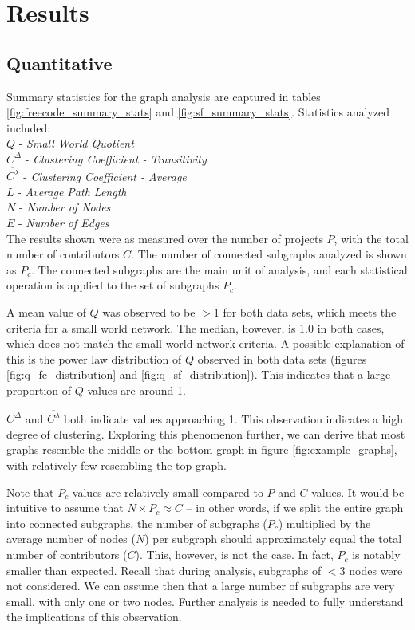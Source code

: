 \documentclass{proc}
\begin{document}
\section{Results}

\subsection{Quantitative}




Summary statistics for the graph analysis are captured in tables \ref{fig:freecode_summary_stats} and \ref{fig:sf_summary_stats}.  Statistics analyzed included:\\
$Q$ - \textit{Small World Quotient}\\
$C^\Delta$ - \textit{Clustering Coefficient - Transitivity}\\
$\overline{C^\lambda}$ - \textit{Clustering Coefficient - Average}\\
$L$ - \textit{Average Path Length}\\
$N$ - \textit{Number of Nodes}\\
$E$ - \textit{Number of Edges}\\
The results shown were as measured over the number of projects $P$, with the total number of contributors $C$. The number of connected subgraphs analyzed is shown as $P_c$. The connected subgraphs are the main unit of analysis, and each statistical operation is applied to the set of subgraphs $P_c$.

A mean value of $Q$ was observed to be $> 1$ for both data sets, which meets the criteria for a small world network\cite{humphries2008network}. The median, however, is 1.0 in both cases, which does not match the small world network criteria. A possible explanation of this is the power law distribution of $Q$ observed in both data sets (figures \ref{fig:q_fc_distribution} and \ref{fig:q_sf_distribution}). This indicates that a large proportion of $Q$ values are around 1.

$C^\Delta$ and $\overline{C^\lambda}$ both indicate values approaching 1. This observation indicates a high degree of clustering\cite{watts1998collective}. Exploring this phenomenon further, we can derive that most graphs resemble the middle or the bottom graph in figure \ref{fig:example_graphs}, with relatively few resembling the top graph.

Note that $P_c$ values are relatively small compared to $P$ and $C$ values. It would be intuitive to assume that {$N \times P_c \approx C$} -- in other words, if we split the entire graph into connected subgraphs, the number of subgraphs ($P_c$) multiplied by the average number of nodes ($N$) per subgraph should approximately equal the total number of contributors ($C$). This, however, is not the case. In fact, $P_c$ is notably smaller than expected. Recall that during analysis, subgraphs of {$< 3$} nodes were not considered. We can assume then that a large number of subgraphs are very small, with only one or two nodes. Further analysis is needed to fully understand the implications of this observation.
\end{document}
